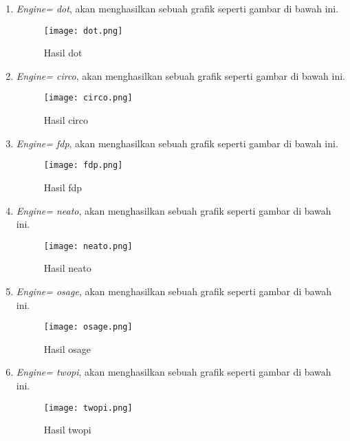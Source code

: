 \begin{enumerate}
\item \textit{Engine= dot}, akan menghasilkan sebuah grafik seperti gambar di bawah ini.
\begin{figure}[H]
		\left
		\texttt{[image: dot.png]}
		\caption{Hasil dot}
		\label{fig: dot}
\end{figure}

\item \textit{Engine= circo}, akan menghasilkan sebuah grafik seperti gambar di bawah ini.
\begin{figure}[H]
		\left
		\texttt{[image: circo.png]}
		\caption{Hasil circo}
		\label{fig: circo}
\end{figure} 

\item \textit{Engine= fdp}, akan menghasilkan sebuah grafik seperti gambar di bawah ini.
\begin{figure}[H]
		\left
		\texttt{[image: fdp.png]}
		\caption{Hasil fdp}
		\label{fig: fdp}
\end{figure}

\item \textit{Engine= neato}, akan menghasilkan sebuah grafik seperti gambar di bawah ini.
\begin{figure}[H]
		\left
		\texttt{[image: neato.png]}
		\caption{Hasil neato}
		\label{fig: neato}
\end{figure}

\item \textit{Engine= osage}, akan menghasilkan sebuah grafik seperti gambar di bawah ini.
\begin{figure}[H]
		\left
		\texttt{[image: osage.png]}
		\caption{Hasil osage}
		\label{fig: osage}
\end{figure}

\item \textit{Engine= twopi}, akan menghasilkan sebuah grafik seperti gambar di bawah ini.
\begin{figure}[H]
		\left
		\texttt{[image: twopi.png]}
		\caption{Hasil twopi}
		\label{fig: twopi}
\end{figure}

\end{enumerate}